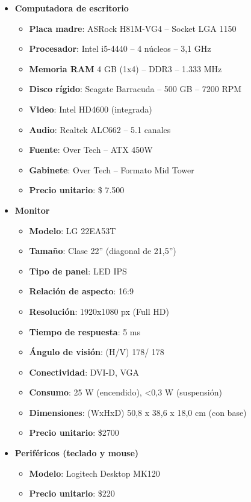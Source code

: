     \begin{itemize}
		\item \textbf{Computadora de escritorio}
        
        \begin{itemize}
            \item \textbf{Placa madre}: ASRock H81M-VG4 – Socket LGA 1150
            \item \textbf{Procesador}: Intel i5-4440 – 4 núcleos – 3,1 GHz
            \item \textbf{Memoria RAM} 4 GB (1x4) – DDR3 – 1.333 MHz
            \item \textbf{Disco rígido}: Seagate Barracuda – 500 GB – 7200 RPM
            \item \textbf{Video}: Intel HD4600 (integrada)
            \item \textbf{Audio}: Realtek ALC662 – 5.1 canales
            \item \textbf{Fuente}: Over Tech – ATX 450W
            \item \textbf{Gabinete}: Over Tech – Formato Mid Tower
            \item \textbf{Precio unitario}: \$ 7.500
        \end{itemize}
        
        \item \textbf{Monitor}
        
        \begin{itemize}
            \item \textbf{Modelo}: LG 22EA53T
            \item \textbf{Tamaño}: Clase 22” (diagonal de 21,5”)
            \item \textbf{Tipo de panel}: LED IPS
            \item \textbf{Relación de aspecto}: 16:9
            \item \textbf{Resolución}: 1920x1080 px (Full HD)
            \item \textbf{Tiempo de respuesta}: 5 ms
            \item \textbf{Ángulo de visión}: (H/V) 178\degree / 178\degree
            \item \textbf{Conectividad}: DVI-D, VGA
            \item \textbf{Consumo}: 25 W (encendido), <0,3 W (suspensión)
            \item \textbf{Dimensiones}: (WxHxD) 50,8 x 38,6 x 18,0 cm (con base)
            \item \textbf{Precio unitario}: \$2700
        \end{itemize}
        
        \item \textbf{Periféricos (teclado y mouse)}
        
        \begin{itemize}
            \item \textbf{Modelo}: Logitech Desktop MK120
            \item \textbf{Precio unitario}: \$220
        \end{itemize}        
	\end{itemize}


